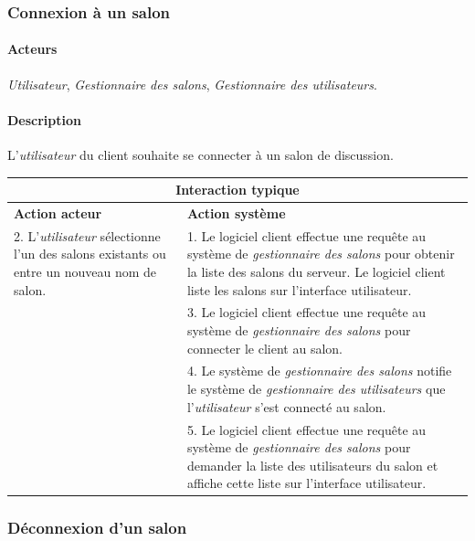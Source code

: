\documentclass[a4paper]{article}
\begin{document}
    \subsubsection{Connexion à un salon}

    \paragraph{Acteurs} \textit{Utilisateur}, \textit{Gestionnaire des salons},
    \textit{Gestionnaire des utilisateurs}.

    \paragraph{Description} L'\textit{utilisateur} du client souhaite se
    connecter à un salon de discussion.

    \begin{center}
        \begin{tabular}{|p{6cm}|p{6cm}|}
            \hline
            \multicolumn{2}{|c|}{\textbf{Interaction typique}} \\ \hline
            \textbf{Action acteur} & \textbf{Action système} \\ \hline
            2. L'\textit{utilisateur} sélectionne l'un des salons existants
            ou entre un nouveau nom de salon. &
            1. Le logiciel client effectue une requête au système de
            \textit{gestionnaire des salons} pour obtenir la liste des salons du
            serveur. Le logiciel client liste les salons sur l'interface
            utilisateur. \\
            & 3. Le logiciel client effectue une requête au système de
            \textit{gestionnaire des salons} pour connecter le client au salon.
            \\
            & 4. Le système de \textit{gestionnaire des salons} notifie le
            système de \textit{gestionnaire des utilisateurs} que
            l'\textit{utilisateur} s'est connecté au salon. \\
            & 5. Le logiciel client effectue une requête au système de
            \textit{gestionnaire des salons} pour demander la liste des
            utilisateurs du salon et affiche cette liste sur l'interface
            utilisateur. \\
            \hline
        \end{tabular}
    \end{center}

   \subsubsection{Déconnexion d'un salon}
\end{document}
